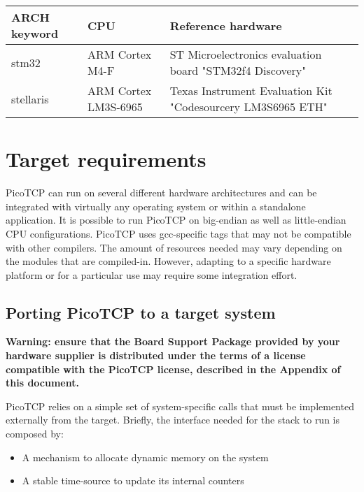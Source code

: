 \begin{longtable}{ | l | l | p{5cm} | }
\hline
{\bf ARCH keyword} &
{\bf CPU} &
{\bf Reference hardware}
\\ \hline

stm32&
ARM Cortex M4-F&
ST Microelectronics evaluation board "STM32f4 Discovery"
\\ \hline

stellaris&
ARM Cortex LM3S-6965&
Texas Instrument Evaluation Kit "Codesourcery LM3S6965 ETH"
\\ \hline

\end{longtable}



\section{Target requirements}
PicoTCP can run on several different hardware architectures and can be
integrated with virtually any operating system or within a standalone
application. It is possible to run PicoTCP on big-endian as well as
little-endian CPU configurations. PicoTCP uses gcc-specific tags that may
not be compatible with other compilers. The amount of resources needed
may vary depending on the modules that are compiled-in. However, adapting
to a specific hardware platform or for a particular use may require some
integration effort.

\subsection{Porting PicoTCP to a target system}

\begin{center}
\textbf{Warning: ensure that the Board Support Package provided by your
hardware supplier is distributed under the terms of a license compatible
with the PicoTCP license, described in the Appendix of this document.}
\end{center}

PicoTCP relies on a simple set of system-specific calls that must be
implemented externally from the target. Briefly, the interface needed for
the stack to run is composed by:
\begin{itemize}
\item A mechanism to allocate dynamic memory on the system
\item A stable time-source to update its internal counters
\end{itemize} 

